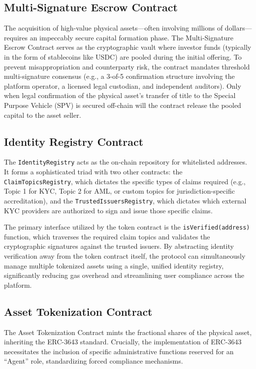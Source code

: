 \documentclass[12pt, a4paper]{article}
\begin{document}
\subsection{Multi-Signature Escrow Contract}
The acquisition of high-value physical assets—often involving millions of dollars—requires an impeccably secure capital formation phase. The Multi-Signature Escrow Contract serves as the cryptographic vault where investor funds (typically in the form of stablecoins like USDC) are pooled during the initial offering. To prevent misappropriation and counterparty risk, the contract mandates threshold multi-signature consensus (e.g., a 3-of-5 confirmation structure involving the platform operator, a licensed legal custodian, and independent auditors). Only when legal confirmation of the physical asset's transfer of title to the Special Purpose Vehicle (SPV) is secured off-chain will the contract release the pooled capital to the asset seller.

\subsection{Identity Registry Contract}
The \texttt{IdentityRegistry} acts as the on-chain repository for whitelisted addresses. It forms a sophisticated triad with two other contracts: the \texttt{ClaimTopicsRegistry}, which dictates the specific types of claims required (e.g., Topic 1 for KYC, Topic 2 for AML, or custom topics for jurisdiction-specific accreditation), and the \texttt{TrustedIssuersRegistry}, which dictates which external KYC providers are authorized to sign and issue those specific claims.

The primary interface utilized by the token contract is the \texttt{isVerified(address)} function, which traverses the required claim topics and validates the cryptographic signatures against the trusted issuers. By abstracting identity verification away from the token contract itself, the protocol can simultaneously manage multiple tokenized assets using a single, unified identity registry, significantly reducing gas overhead and streamlining user compliance across the platform.

\subsection{Asset Tokenization Contract}
The Asset Tokenization Contract mints the fractional shares of the physical asset, inheriting the ERC-3643 standard. Crucially, the implementation of ERC-3643 necessitates the inclusion of specific administrative functions reserved for an ``Agent'' role, standardizing forced compliance mechanisms.
\end{document}
